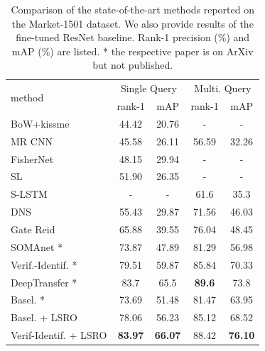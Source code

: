 \documentclass[10pt,twocolumn,letterpaper]{article}
\begin{document}
\begin{table}
\begin{center}
\begin{tabular}{l|cc|cc}
\hline
\multirow{2}{*}{method} & \multicolumn{2}{c|}{Single Query} & \multicolumn{2}{c}{Multi. Query}\\
& rank-1 & mAP & rank-1  & mAP \\
\hline
BoW+kissme \cite{zheng2015scalable} & 44.42 & 20.76  & - & -\\
MR CNN \cite{ustinova2015multiregion} & 45.58 & 26.11 & 56.59 & 32.26 \\
FisherNet \cite{wu2016deep} & 48.15 & 29.94 & - & -\\
SL \cite{chen2016similarity} & 51.90 & 26.35  & - & -\\
S-LSTM \cite{varior2016siamese} & - & - & 61.6 & 35.3 \\
DNS \cite{zhang2016learning} & 55.43 & 29.87 & 71.56 & 46.03 \\
Gate Reid \cite{varior2016gated}  & 65.88 & 39.55& 76.04 & 48.45 \\
SOMAnet \cite{barbosa2017looking}*& 73.87 & 47.89 & 81.29 & 56.98 \\ 
Verif.-Identif. \cite{zheng2016discriminatively}* & 79.51 & 59.87  & 85.84 & 70.33 \\
DeepTransfer \cite{geng2016deep}* & 83.7 & 65.5 & \textbf{89.6} & 73.8 \\ 
\hline
Basel. \cite{zheng2016survey,zheng2016discriminatively}* & 73.69 & 51.48 & 81.47 & 63.95 \\
Basel. + LSRO & 78.06 & 56.23  & 85.12 & 68.52 \\
Verif-Identif. + LSRO & \textbf{83.97} & \textbf{66.07} & 88.42 & \textbf{76.10}  \\
\hline
\end{tabular}
\end{center}
\caption{Comparison of the state-of-the-art methods reported on the Market-1501 dataset. We also provide results of the fine-tuned ResNet baseline. Rank-1 precision (\%) and mAP (\%) are listed. * the respective paper is on ArXiv but not published.}
\label{table:mr}
\end{table}
\end{document}
